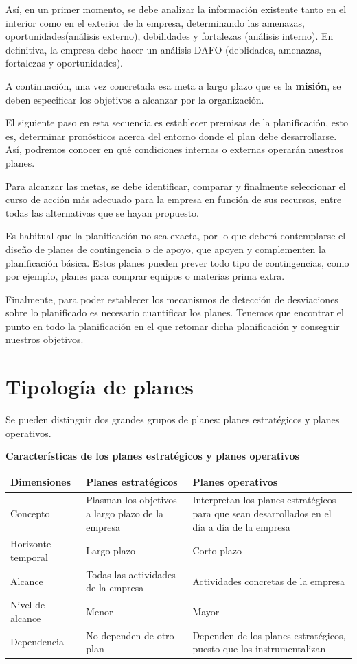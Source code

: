 \documentclass[12pt,a4paper,spanish]{report}
\begin{document}
		Así, en un primer momento, se debe analizar la información existente tanto en el interior como en el exterior de la empresa, determinando las amenazas, oportunidades(análisis externo), debilidades y fortalezas (análisis interno). En definitiva, la empresa debe hacer un análisis DAFO (deblidades, amenazas, fortalezas y oportunidades).

		A continuación, una vez concretada esa meta a largo plazo que es la \textbf{misión}, se deben especificar los objetivos a alcanzar por la organización.

		El siguiente paso en esta secuencia es establecer premisas de la planificación, esto es, determinar pronósticos acerca del entorno donde el plan debe desarrollarse. Así, podremos conocer en qué condiciones internas o externas operarán nuestros planes.

		Para alcanzar las metas, se debe identificar, comparar y finalmente seleccionar el curso de acción más adecuado para la empresa en función de sus recursos, entre todas las alternativas que se hayan propuesto.

		Es habitual que la planificación no sea exacta, por lo que deberá contemplarse el diseño de planes de contingencia o de apoyo, que apoyen y complementen la planificación básica. Estos planes pueden prever todo tipo de contingencias, como por ejemplo, planes para comprar equipos o materias prima extra.

		Finalmente, para poder establecer los mecanismos de detección de desviaciones sobre lo planificado es necesario cuantificar los planes. Tenemos que encontrar el punto en todo la planificación en el que retomar dicha planificación y conseguir nuestros objetivos.
	\newpage
	\section{\textcolor[rgb]{0.3,0.6,0.4}Tipología de planes}
		Se pueden distinguir dos grandes grupos de planes: planes estratégicos y planes operativos.

		\begin{center}
			\textbf{Características de los planes estratégicos y planes operativos}
			\begin{tabular}{|p{4.7cm}|p{4.7cm}|p{4.7cm}|}
				\hline
				\rowcolor[rgb]{0.3,0.6,0.4} \textbf{Dimensiones} & \textbf{Planes estratégicos} & \textbf{Planes operativos} \\
				\hline
				Concepto & Plasman los objetivos a largo plazo de la empresa & Interpretan los planes estratégicos para que sean desarrollados en el día a día de la empresa \\
				\hline			
				Horizonte temporal & Largo plazo & Corto plazo \\
				\hline
				Alcance & Todas las actividades de la empresa & Actividades concretas de la empresa \\
				\hline
				Nivel de alcance & Menor & Mayor \\
				\hline
				Dependencia & No dependen de otro plan & Dependen de los planes estratégicos, puesto que los instrumentalizan \\
				\hline
			\end{tabular}
		\end{center}
\end{document}
